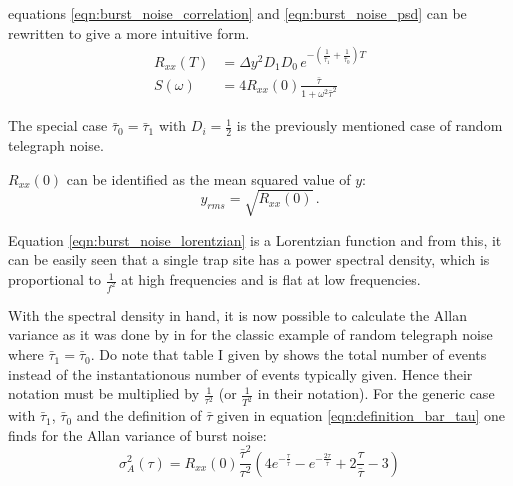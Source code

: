 equations \ref{eqn:burst_noise_correlation} and \ref{eqn:burst_noise_psd} can be rewritten to give a more intuitive form.
\begin{align}
    R_{xx}(T) &= \Delta y^2 D_1 D_0 \, e^{-\left(\frac{1}{\bar \tau_1}+\frac{1}{\bar \tau_0}\right)T}\\
    S(\omega) &= 4 R_{xx}(0) \frac{\bar \tau}{1 + \omega^2 \bar \tau^2} \label{eqn:burst_noise_lorentzian}
\end{align}

The special case $\bar \tau_0 = \bar \tau_1$ with $D_i=\frac 1 2$ is the previously mentioned case of random telegraph noise.

$R_{xx}(0)$ can be identified as the mean squared value of $y$:
\begin{equation}
    y_{rms} = \sqrt{R_{xx}(0)} \,.
\end{equation}

Equation \ref{eqn:burst_noise_lorentzian} is a Lorentzian function and from this, it can be easily seen that a single trap site has a power spectral density, which is proportional to $\frac{1}{f^2}$ at high frequencies and is flat at low frequencies.

With the spectral density in hand, it is now possible to calculate the Allan variance as it was done by \citeauthor{allen_dev_flicker} in \cite{allen_dev_flicker} for the classic example of random telegraph noise where $\bar \tau_1 = \bar \tau_0$. Do note that table I given by \citeauthor{allen_dev_flicker} shows the total number of events instead of the instantationous number of events typically given. Hence their notation must be multiplied by $\frac{1}{\tau^2}$ (or $\frac{1}{T^2}$ in their notation). For the generic case with $\bar \tau_1$, $\bar \tau_0$ and the definition of $\bar \tau$ given in equation \ref{eqn:definition_bar_tau} one finds for the Allan variance of burst noise:
\begin{equation}
    \sigma^2_A(\tau) = R_{xx}(0) \frac{\bar \tau^2}{\tau^2} \left(4 e^{-\frac{\tau}{\bar \tau}} - e^{-\frac{2 \tau}{\bar \tau}} + 2 \frac{\tau}{\bar \tau} - 3 \right) \label{eqn:burst_noise_avar}
\end{equation}


